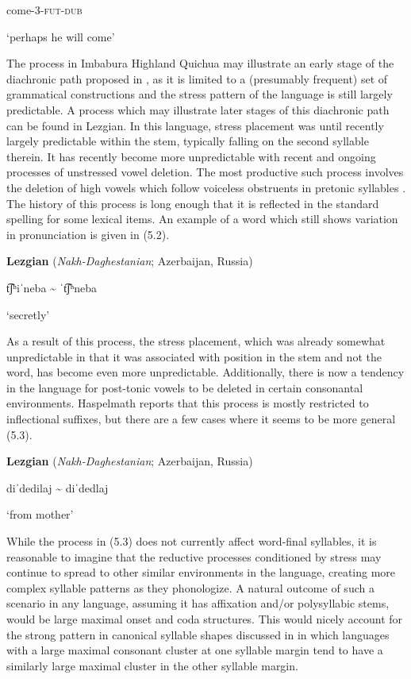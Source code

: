 come-3-\textsc{fut-dub}

‘perhaps he will come’

\citep[209]{Cole1982}

\z

  The process in Imbabura Highland Quichua may illustrate an early stage of the diachronic path proposed in \citet{BybeeEtAl1998}, as it is limited to a (presumably frequent) set of grammatical constructions and the stress pattern of the language is still largely predictable. A process which may illustrate later stages of this diachronic path can be found in Lezgian. In this language, stress placement was until recently largely predictable within the stem, typically falling on the second syllable therein. It has recently become more unpredictable with recent and ongoing processes of unstressed vowel deletion. The most productive such process involves the deletion of high vowels which follow voiceless obstruents in pretonic syllables \citep[36]{Haspelmath1993}. The history of this process is long enough that it is reflected in the standard spelling for some lexical items. An example of a word which still shows variation in pronunciation is given in (5.2).

\ea\label{ex:(5.2)}
  \textbf{Lezgian} (\textit{Nakh-Daghestanian}; Azerbaijan, Russia)

t͡ʃʰiˈneba {\textasciitilde} ˈt͡ʃʰneba

‘secretly’

\citep[38]{Haspelmath1993}

\z

As a result of this process, the stress placement, which was already somewhat unpredictable in that it was associated with position in the stem and not the word, has become even more unpredictable. Additionally, there is now a tendency in the language for post-tonic vowels to be deleted in certain consonantal environments. Haspelmath reports that this process is mostly restricted to inflectional suffixes, but there are a few cases where it seems to be more general (5.3).

\ea\label{ex:(5.3)}
  \textbf{Lezgian} (\textit{Nakh-Daghestanian}; Azerbaijan, Russia)

diˈdedilaj {\textasciitilde} diˈdedlaj

‘from mother’

\citep[40]{Haspelmath1993}

\z

  While the process in (5.3) does not currently affect word-final syllables, it is reasonable to imagine that the reductive processes conditioned by stress may continue to spread to other similar environments in the language, creating more complex syllable patterns as they phonologize. A natural outcome of such a scenario in any language, assuming it has affixation and/or polysyllabic stems, would be large maximal onset and coda structures. This would nicely account for the strong pattern in canonical syllable shapes discussed in  in which languages with a large maximal consonant cluster at one syllable margin tend to have a similarly large maximal cluster in the other syllable margin.

